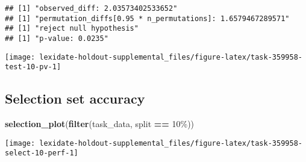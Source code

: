 \documentclass[
]{book}
\newenvironment{Shaded}{\begin{snugshade}}{\end{snugshade}}
\newcommand{\AttributeTok}[1]{\textcolor[rgb]{0.13,0.29,0.53}{#1}}
\newcommand{\DecValTok}[1]{\textcolor[rgb]{0.00,0.00,0.81}{#1}}
\newcommand{\FunctionTok}[1]{\textcolor[rgb]{0.13,0.29,0.53}{\textbf{#1}}}
\newcommand{\NormalTok}[1]{#1}
\newcommand{\OtherTok}[1]{\textcolor[rgb]{0.56,0.35,0.01}{#1}}
\newcommand{\SpecialCharTok}[1]{\textcolor[rgb]{0.81,0.36,0.00}{\textbf{#1}}}
\newcommand{\StringTok}[1]{\textcolor[rgb]{0.31,0.60,0.02}{#1}}
\begin{document}
\begin{Shaded}
\end{Shaded}

\begin{verbatim}
## [1] "observed_diff: 2.03573402533652"
## [1] "permutation_diffs[0.95 * n_permutations]: 1.6579467289571"
## [1] "reject null hypothesis"
## [1] "p-value: 0.0235"
\end{verbatim}

\texttt{[image: lexidate-holdout-supplemental\_files/figure-latex/task-359958-test-10-pv-1]}

\hypertarget{selection-set-accuracy-31}{%
\subsection{Selection set accuracy}\label{selection-set-accuracy-31}}

\begin{Shaded}
\begin{Highlighting}[]
\FunctionTok{selection\_plot}\NormalTok{(}\FunctionTok{filter}\NormalTok{(task\_data, split }\SpecialCharTok{==} \StringTok{\textquotesingle{}10\%\textquotesingle{}}\NormalTok{))}
\end{Highlighting}
\end{Shaded}

\texttt{[image: lexidate-holdout-supplemental\_files/figure-latex/task-359958-select-10-perf-1]}
\end{document}
